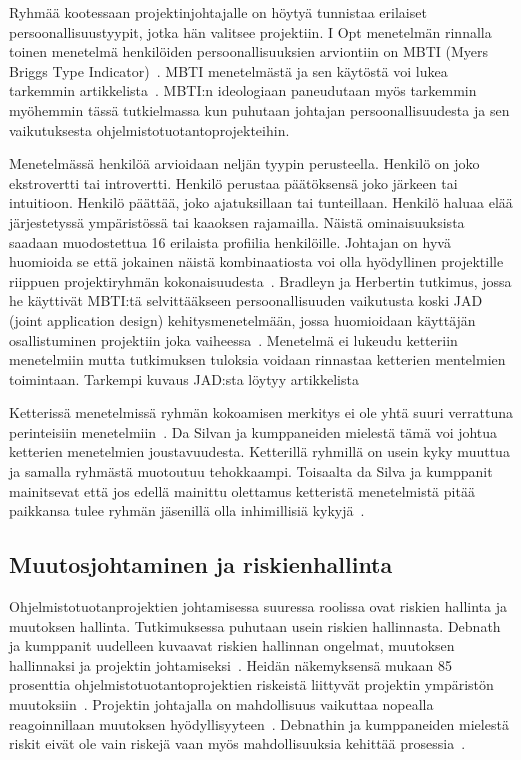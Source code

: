 \documentclass[finnish]{tktltiki2}
\theoremstyle{definition}
\theoremstyle{remark}
\begin{document}
Ryhmää kootessaan projektinjohtajalle on höytyä tunnistaa erilaiset persoonallisuustyypit, jotka hän valitsee projektiin. I Opt menetelmän rinnalla toinen menetelmä henkilöiden persoonallisuuksien arviontiin on MBTI (Myers Briggs Type Indicator)~\cite{bradley1997effect}. MBTI menetelmästä ja sen käytöstä voi lukea tarkemmin artikkelista~\cite{myers1985manual}. MBTI:n ideologiaan paneudutaan myös tarkemmin myöhemmin tässä tutkielmassa kun puhutaan johtajan persoonallisuudesta ja sen vaikutuksesta ohjelmistotuotantoprojekteihin.

Menetelmässä henkilöä arvioidaan neljän tyypin perusteella. Henkilö on joko ekstrovertti tai introvertti. Henkilö perustaa päätöksensä joko järkeen tai intuitioon. Henkilö päättää, joko ajatuksillaan tai tunteillaan. Henkilö haluaa elää järjestetyssä ympäristössä tai kaaoksen rajamailla. Näistä ominaisuuksista saadaan muodostettua 16 erilaista profiilia henkilöille. Johtajan on hyvä huomioida se että jokainen näistä kombinaatiosta voi olla hyödyllinen projektille riippuen projektiryhmän kokonaisuudesta~\cite{bradley1997effect}. Bradleyn ja Herbertin tutkimus, jossa he käyttivät MBTI:tä selvittääkseen persoonallisuuden vaikutusta koski JAD (joint application design) kehitysmenetelmään, jossa huomioidaan käyttäjän osallistuminen projektiin joka vaiheessa~\cite{bradley1997effect}. Menetelmä ei lukeudu ketteriin menetelmiin mutta tutkimuksen tuloksia voidaan rinnastaa ketterien mentelmien toimintaan. Tarkempi kuvaus JAD:sta löytyy artikkelista~\cite{Davidson1999215}

Ketterissä menetelmissä ryhmän kokoamisen merkitys ei ole yhtä suuri verrattuna perinteisiin menetelmiin~\cite{daSilva2012}. Da Silvan ja kumppaneiden mielestä tämä voi johtua ketterien menetelmien joustavuudesta. Ketterillä ryhmillä on usein kyky muuttua ja samalla ryhmästä muotoutuu tehokkaampi. Toisaalta da Silva ja kumppanit mainitsevat että jos edellä mainittu olettamus ketteristä menetelmistä pitää paikkansa tulee ryhmän jäsenillä olla inhimillisiä kykyjä~\cite{daSilva2012}.


\subsection{Muutosjohtaminen ja riskienhallinta}

Ohjelmistotuotanprojektien johtamisessa suuressa roolissa ovat riskien hallinta ja muutoksen hallinta. Tutkimuksessa puhutaan usein riskien hallinnasta. Debnath ja kumppanit uudelleen kuvaavat riskien hallinnan ongelmat, muutoksen hallinnaksi ja projektin johtamiseksi~\cite{4017705}. Heidän näkemyksensä mukaan 85 prosenttia ohjelmistotuotantoprojektien riskeistä liittyvät projektin ympäristön muutoksiin~\cite{4017705}. Projektin johtajalla on mahdollisuus vaikuttaa nopealla reagoinnillaan muutoksen hyödyllisyyteen~\cite{4017705}. Debnathin ja kumppaneiden mielestä riskit eivät ole vain riskejä vaan myös mahdollisuuksia kehittää prosessia~\cite{4017705}.
\end{document}
